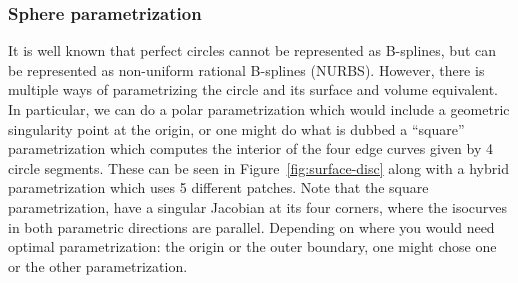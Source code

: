 \documentclass[preprint,12pt, a4paper]{elsarticle}
\begin{document}
\subsubsection{Sphere parametrization}
\label{sec:sphere}
It is well known that perfect circles cannot be represented as B-splines, but can be represented as non-uniform rational B-splines (NURBS).
However, there is multiple ways of parametrizing the circle and its surface and volume equivalent.
In particular, we can do a polar parametrization which would include a geometric singularity point at the origin, or one might do what is dubbed a ``square'' parametrization which computes the interior of the four edge curves given by 4 circle segments.
These can be seen in Figure~\ref{fig:surface-disc} along with a hybrid parametrization which uses 5 different patches.
Note that the square parametrization, have a singular Jacobian at its four corners, where the isocurves in both parametric directions are parallel.
Depending on where you would need optimal parametrization: the origin or the outer boundary, one might chose one or the other parametrization.
\end{document}
